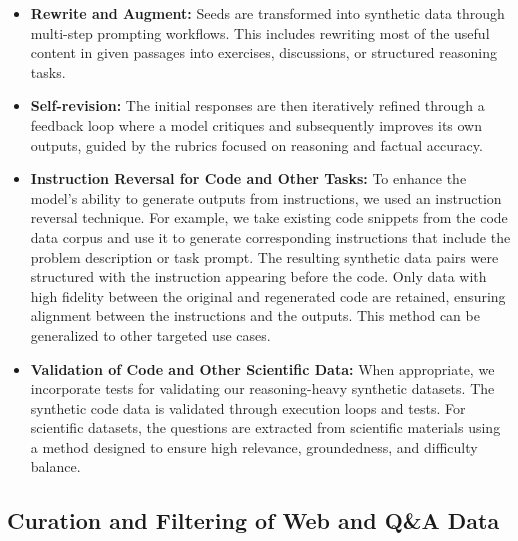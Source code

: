 \documentclass[11pt]{article}
\begin{document}
\begin{itemize}
\begin{enumerate}
\end{enumerate}
    \item \textbf{Rewrite and Augment:} Seeds are transformed into synthetic data through multi-step prompting workflows. This includes rewriting most of the useful content in given passages into exercises, discussions, or structured reasoning tasks. 
    \item \textbf{Self-revision:} The initial responses are then iteratively refined through a feedback loop where a model critiques and subsequently improves its own outputs, guided by the rubrics focused on reasoning and factual accuracy.
    \item \textbf{Instruction Reversal for Code and Other Tasks:} To enhance the model’s ability to generate outputs from instructions, we used an instruction reversal technique. For example, we take existing code snippets from the code data corpus and use it to generate corresponding instructions that include the problem description or task prompt. The resulting synthetic data pairs were structured with the instruction appearing before the code. Only data with high fidelity between the original and regenerated code are retained, ensuring alignment between the instructions and the outputs. This method can be generalized to other targeted use cases. 
    \item \textbf{Validation of Code and Other Scientific Data:} When appropriate, we incorporate tests for validating our reasoning-heavy synthetic datasets. The synthetic code data is validated through execution loops and tests. For scientific datasets, the questions are extracted from scientific materials using a method designed to ensure high relevance, groundedness, and difficulty balance. 
\end{itemize}

\subsection{Curation and Filtering of Web and Q\&A Data}
\end{document}
